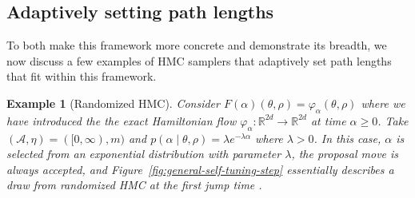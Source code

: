 \documentclass[ejs]{imsart}
\theoremstyle{plain}%
\newtheorem{example}[prototheorem]{Example}
\theoremstyle{remark}
\begin{document}
\subsection{Adaptively setting path lengths}

To both make this framework more concrete and  demonstrate its breadth, we now discuss a few examples of HMC samplers that adaptively set path lengths that fit within this framework.  

\begin{example}[Randomized HMC]
Consider $F(\alpha)(\theta, \rho) = \varphi_\alpha(\theta, \rho)$ where we have introduced the the exact Hamiltonian flow $\varphi_{\alpha}: \mathbb{R}^{2d} \to \mathbb{R}^{2d}$ at time $\alpha \ge 0$. Take $(\mathcal{A},\eta) = ([0, \infty), m)$ and $p(\alpha \mid \theta, \rho) = \lambda e^{- \lambda \alpha}$ where $\lambda > 0$. In this case, $\alpha$ is selected from an exponential distribution with parameter $\lambda$, the proposal move is always accepted, and Figure~\ref{fig:general-self-tuning-step} essentially describes a draw from randomized HMC at the first jump time \cite{BoSa2017,BoEb2022}.
\end{example}
\end{document}
